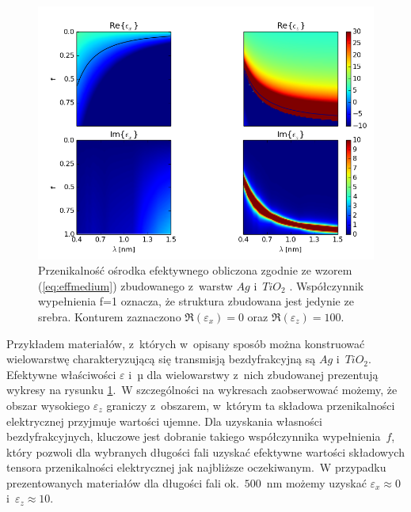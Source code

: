 \begin{figure}[tbh]
	\includegraphics[width=\textwidth]{images/multilayer/agtio2-effective.png}
	\caption{Przenikalność ośrodka efektywnego obliczona zgodnie ze wzorem (\ref{eq:effmedium})  zbudowanego z~warstw $Ag$ \cite{PhysRevB.6.4370} i~$TiO_2$ \cite{DEVORE:51}. Współczynnik wypełnienia f=1 oznacza, że struktura zbudowana jest jedynie ze srebra. Konturem zaznaczono $\Re(\varepsilon_x)=0$ oraz $\Re(\varepsilon_z)=100$.}
	\label{fig:multiex}
\end{figure}

Przykładem materiałów, z~których w~opisany sposób można konstruować wielowarstwę charakteryzującą się transmisją bezdyfrakcyjną są $Ag$ i~$TiO_2$. Efektywne właściwości $\varepsilon$ i~µ dla wielowarstwy z~nich zbudowanej prezentują wykresy na rysunku \ref{fig:multiex}.~W szczególności na wykresach zaobserwować możemy, że obszar wysokiego $\varepsilon_z$ graniczy z~obszarem, w~którym ta składowa przenikalności elektrycznej przyjmuje wartości ujemne. Dla uzyskania własności bezdyfrakcyjnych, kluczowe jest dobranie takiego współczynnika wypełnienia~$f$, który pozwoli dla wybranych długości fali uzyskać efektywne wartości składowych tensora przenikalności elektrycznej jak najbliższe oczekiwanym.~W przypadku prezentowanych materiałów dla długości fali ok.~$500$~nm możemy uzyskać $\varepsilon_x \approx 0$ i~$\varepsilon_z \approx 10$.







